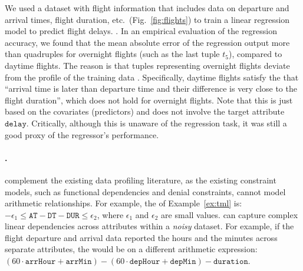 \begin{example}\label{ex:tml}

We used a dataset with flight information that includes data on departure and
arrival times, flight duration, etc.\ (Fig.~\ref{fig:flights}) to train a
linear regression model to predict flight delays. . In an empirical evaluation of the regression
accuracy, we found that the mean absolute error of the regression output more
than quadruples for overnight flights (such as the last tuple $t_5$), compared
to daytime flights. The reason is that tuples representing overnight flights
deviate from the profile of the training data . Specifically, daytime flights satisfy the \di that ``arrival
time is later than departure time and their difference is very close to the
flight duration'', which does not hold for overnight flights. Note that this
\invariant is just based on the covariates (predictors) and does not involve
the target attribute $\mathtt{delay}$. Critically, although this \di is unaware
of the regression task, it was still a good proxy of the regressor's
performance. 
\end{example}

\label{extake}

\smallskip

\paragraph{\Dis.} \Dis complement the existing data profiling literature, as
the existing constraint models, such as functional dependencies and denial
constraints, cannot model arithmetic relationships. For example, the \di of
Example~\ref{ex:tml} is: $-\epsilon_1 \le \mathtt{AT} - \mathtt{DT} -
\mathtt{DUR} \le \epsilon_2$, where $\epsilon_1$ and $\epsilon_2$ are small
values. \Dis can capture complex linear dependencies across attributes within a
\emph{noisy} dataset. For example, if the flight departure and arrival data
reported the hours and the minutes across separate attributes, the \invariant
would be on a different arithmetic expression: $(60\cdot \mathtt{arrHour} +
\mathtt{arrMin}) - (60\cdot \mathtt{depHour} + \mathtt{depMin}) -
\mathtt{duration}$.

